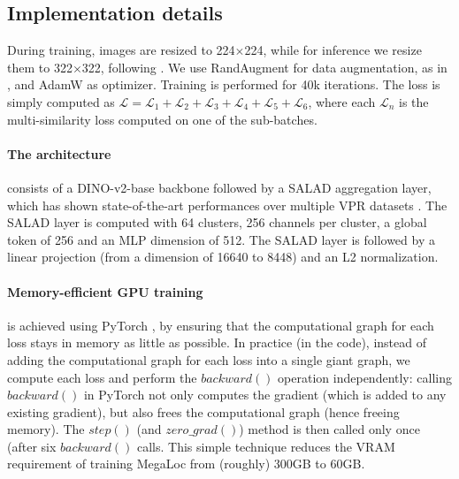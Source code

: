 \subsection{Implementation details}
\label{sec:implementation_details}
During training, images are resized to 224$\times$224, while for inference we resize them to 322$\times$322, following \cite{Izquierdo_2024_SALAD}.
We use RandAugment \cite{Cubuk_2020_RandAugment} for data augmentation, as in \cite{Alibey_2022_gsvcities}, and AdamW \cite{Loshchilov_2018_AdamW} as optimizer.
Training is performed for 40k iterations.
The loss is simply computed as
$\mathcal{L} = \mathcal{L}_1 + \mathcal{L}_2 + \mathcal{L}_3 + \mathcal{L}_4 + \mathcal{L}_5 + \mathcal{L}_6$, where each $\mathcal{L}_n$ is the multi-similarity loss computed on one of the sub-batches.

\paragraph{The architecture} consists of a DINO-v2-base backbone \cite{Oquab_2023_dinov2} followed by a SALAD \cite{Izquierdo_2024_SALAD} aggregation layer, which has shown state-of-the-art performances over multiple VPR datasets \cite{Izquierdo_2024_SALAD, Izquierdo_2024_cliqueM}.
The SALAD layer is computed with 64 clusters, 256
channels per cluster, a global token of 256 and an MLP dimension of 512. The SALAD layer is followed by a linear projection (from a dimension of 16640 to 8448) and an L2 normalization.

\paragraph{Memory-efficient GPU training} is achieved using PyTorch \cite{Paszke_2019_PyTorch}, by ensuring that the computational graph for each loss stays in memory as little as possible.
In practice (in the code), instead of adding the computational graph for each loss into a single giant graph, we compute each loss and perform the $backward()$ operation independently:
calling $backward()$ in PyTorch not only computes the gradient (which is added to any existing gradient), but also frees the computational graph (hence freeing memory).
The $step()$ (and $zero\_grad()$) method is then called only once (after six $backward()$ calls.
This simple technique reduces the VRAM requirement of training MegaLoc from (roughly) 300GB to 60GB.


